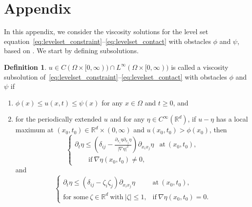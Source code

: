 \documentclass{amsart}
\theoremstyle{definition}
\newtheorem{definition}{Definition}[section]
\def\R{{\mathbb{R}}}
\begin{document}
\section{Appendix}\label{appendix}
In this appendix, we consider the viscosity solutions for the level set equation~\eqref{eq:levelset_constraint}--\eqref{eq:levelset_contact} with obstacles $\phi$ and $\psi$, based on \cite{MR1100206, Mercier}. We start by defining subsolutions.

\begin{definition}
    $u \in C (\Omega \times [0,\infty)) \cap L^\infty (\Omega \times [0,\infty))$
    is called a viscosity subsolution of~\eqref{eq:levelset_constraint}--\eqref{eq:levelset_contact}
with obstacles $\phi$ and $\psi$ if 
\begin{enumerate}
    \item[(i)] $\phi (x) \leq u (x,t) \leq \psi (x)$ for any $x \in \Omega$ and $t\geq 0$, and
    \item[(ii)] for the periodically extended $u$ and for any $\eta \in C^\infty (\R^d)$, if $u-\eta$ has a local maximum at $(x_0,t_0) \in \R^d \times (0,\infty)$ and $u(x_0,t_0)>\phi (x_0)$, then 
    \begin{equation*}
    \left\{ 
\begin{array}{ll}
\partial _t \eta \leq \left( 
\delta_{ij} -\frac{\partial_{x_i} \eta \partial _{x_j} \eta}{|\nabla \eta|^2} \right)
\partial_{x_i x_j}\eta & \text{at} \ (x_0,t_0), \\
\qquad \text{if} \ \nabla \eta (x_0,t_0)\not=0, &
\end{array} \right.
    \end{equation*}
and
    \begin{equation*}
    \left\{ 
\begin{array}{ll}
\partial _t \eta \leq \left( 
\delta_{ij} -\zeta _i \zeta_j \right)
\partial_{x_i x_j}\eta & \text{at} \ (x_0,t_0), \\
\text{for some} \ \zeta \in \R^d \ \text{with} \ |\zeta| \leq 1, & \text{if} \ \nabla \eta (x_0,t_0)=0.
\end{array} \right.
    \end{equation*}
\end{enumerate}
\end{definition}
\end{document}
